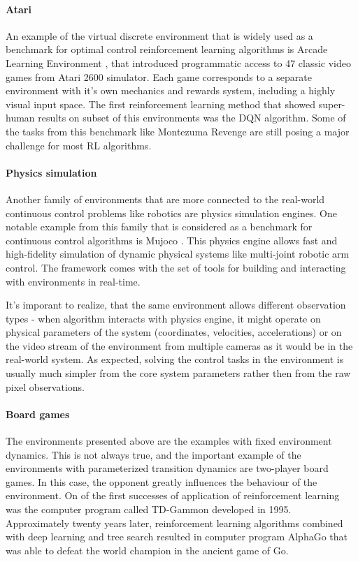\paragraph{Atari}
An example of the virtual discrete environment that is widely used as a benchmark for
optimal control reinforcement learning algorithms is Arcade Learning Environment
\cite{bellemare13arcade}, that introduced programmatic access to 47 classic video games
from Atari 2600 simulator.
Each game corresponds to a separate environment with it's own mechanics and rewards system,
including a highly visual input space. The first reinforcement learning method that showed
super-human results on subset of this environments was the DQN \cite{mnih-dqn-2015} algorithm.
Some of the tasks from this benchmark like Montezuma Revenge are still posing a major
challenge for most RL algorithms.


\paragraph{Physics simulation}
Another family of environments that are more connected to the real-world continuous control
problems like robotics are physics simulation engines. One notable example from this family
that is considered as a benchmark for continuous control algorithms is Mujoco
\cite{todorov2012mujoco}.
This physics engine allows fast and high-fidelity simulation of dynamic physical systems
like multi-joint robotic arm control. The framework comes with the set of tools for
building and interacting with environments in real-time.


It's imporant to realize, that the same environment allows different observation types -
when algorithm interacts with physics engine, it might operate on physical parameters of the
system (coordinates, velocities, accelerations) or on the video stream of the environment from
multiple cameras as it would be in the real-world system. As expected, solving the control
tasks in the environment is usually much simpler from the core system parameters rather
then from the raw pixel observations.

\paragraph{Board games}
The environments presented above are the examples with fixed environment dynamics.
This is not always true, and the important example of the environments with parameterized
transition dynamics are two-player board games. In this case, the opponent greatly influences
the behaviour of the environment. On of the first successes of application of reinforcement
learning was the computer program called TD-Gammon \cite{tesauro1995temporal} developed in 1995.
Approximately twenty years later, reinforcement learning algorithms combined with deep learning and
tree search resulted in computer program AlphaGo \cite{silver2016mastering} that
was able to defeat the world champion in the ancient game of Go.

